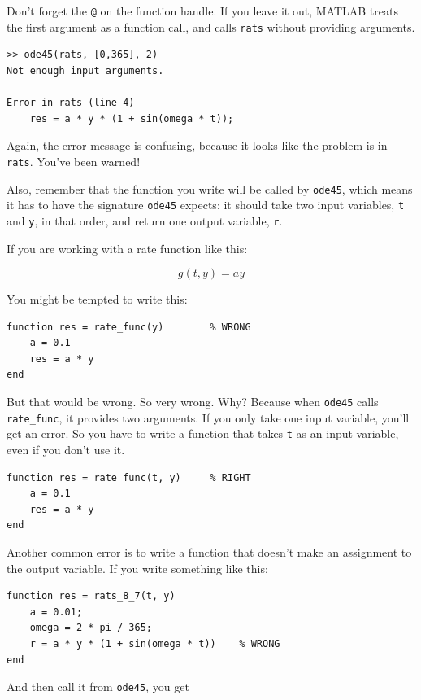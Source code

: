 \documentclass{book}
\begin{document}
Don't forget the {\tt @} on the function handle.
If you leave it out, MATLAB treats the first argument as a function
call, and calls {\tt rats} without providing arguments.

\begin{verbatim}
>> ode45(rats, [0,365], 2)
Not enough input arguments.

Error in rats (line 4)
    res = a * y * (1 + sin(omega * t));
\end{verbatim}

Again, the error message is confusing, because it looks like the problem
is in {\tt rats}.  You've been warned!

Also, remember that the function you write will be called by
{\tt ode45}, which means it has to have the signature {\tt ode45}
expects: it should take two input variables, {\tt t} and {\tt y},
in that order, and return one output variable, {\tt r}.

If you are working with a rate function like this:

\begin{equation}
g(t, y) = a y
\end{equation}

You might be tempted to write this:

\begin{verbatim}
function res = rate_func(y)        % WRONG
    a = 0.1
    res = a * y
end
\end{verbatim}

But that would be wrong.  So very wrong.  Why?  Because
when {\tt ode45} calls {\tt rate\_func}, it provides two arguments.
If you only take one input variable, you'll get an error.  So
you have to write a function that takes {\tt t} as an input
variable, even if you don't use it.

\begin{verbatim}
function res = rate_func(t, y)     % RIGHT
    a = 0.1
    res = a * y
end
\end{verbatim}

Another common error is to write a function that doesn't make
an assignment to the output variable.  If you write something
like this:

\begin{verbatim}
function res = rats_8_7(t, y)
    a = 0.01;
    omega = 2 * pi / 365;
    r = a * y * (1 + sin(omega * t))    % WRONG
end
\end{verbatim}

And then call it from {\tt ode45}, you get
\end{document}
